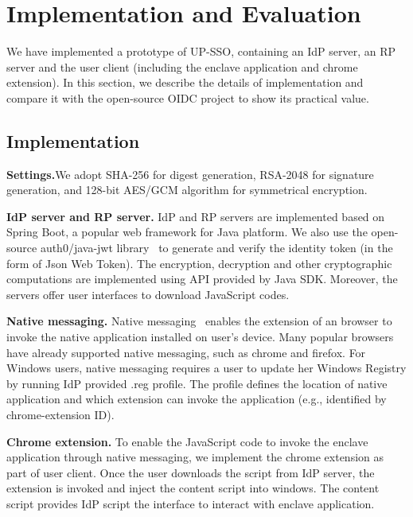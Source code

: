 \section{Implementation and Evaluation}
\label{sec:implementation}
We have implemented  a prototype of UP-SSO, containing an IdP server, an RP server and the user client (including the enclave application and chrome extension).  In this section, we describe the details of implementation and compare it with the open-source OIDC project to show its practical value.
\subsection{Implementation}
\vspace{3mm}\noindent\textbf{Settings.}We adopt SHA-256 for digest generation, RSA-2048 for signature generation, and 128-bit AES/GCM algorithm for symmetrical encryption. 

\vspace{3mm}\noindent\textbf{IdP server and RP server.}
IdP and RP servers are implemented based on Spring Boot, a popular web framework for Java platform. 
We also use the open-source auth0/java-jwt library~\cite{jwt} to generate and verify the identity token (in the form of Json Web Token). 
The encryption, decryption and other cryptographic computations are implemented using API provided by Java SDK. 
Moreover, the servers offer user interfaces to download JavaScript codes.

\vspace{3mm}\noindent\textbf{Native messaging.}
Native messaging~\cite{NativeMessaging} enables the extension of an browser to invoke the native application installed on user's device. 
Many popular browsers have already supported native messaging, such as chrome and firefox. 
For Windows users, native messaging requires a user to update her Windows Registry by running IdP provided .reg profile. The profile defines the location of native application and which extension can invoke the application (e.g., identified by chrome-extension ID). 


\vspace{3mm}\noindent\textbf{Chrome extension.}
To enable the JavaScript code to invoke the enclave application through native messaging, we implement the chrome extension as part of user client. 
Once the user downloads the script from IdP server, the extension is invoked and inject the content script into windows. The content script provides IdP script the interface to interact with enclave application. 



